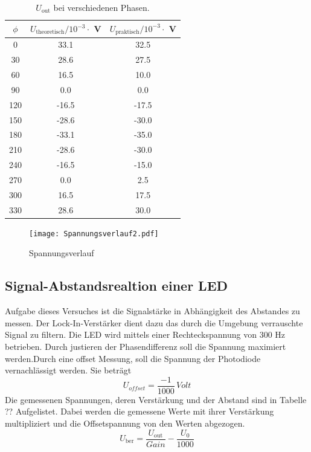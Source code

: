 \begin{table}
    \centering
    \begin{tabular}{c c c}
    	\toprule
    	$\phi$ & $U_{\text{theoretisch}} / 10^{-3} \cdot $ V & $U_{\text{praktisch}} / 10^{-3} \cdot $ V \\
    	\midrule
    	0   &  33.1  &  32.5        \\
    	30  &  28.6  &  27.5        \\
   	60  &  16.5  &  10.0       \\
    	90  &  0.0   &   0.0        \\
    	120 & -16.5  & -17.5        \\ 
    	150 & -28.6  & -30.0        \\
    	180 & -33.1  & -35.0        \\
    	210 & -28.6  & -30.0        \\
    	240 & -16.5  & -15.0        \\
    	270 &  0.0   &  2.5         \\
    	300 &  16.5  &  17.5        \\
  	330 &  28.6  &  30.0        \\
    	\end{tabular}
    \caption{$U_{\text{out}}$ bei verschiedenen Phasen.}
    \label{tab:Uphase2}
\end{table}

\begin{figure}
  \centering
  \texttt{[image: Spannungsverlauf2.pdf]}
  \caption{Spannungsverlauf}
  \label{fig:Spannungsverlauf}
\end{figure}

\subsection{Signal-Abstandsrealtion einer LED}
Aufgabe dieses Versuches ist die Signalstärke in Abhängigkeit des Abstandes zu messen. Der Lock-In-Verstärker dient dazu das durch die Umgebung verrauschte Signal zu filtern. Die LED wird mittels einer Rechteckspannung von 300 Hz betrieben. Durch justieren der Phasendifferenz soll die Spannung maximiert werden.Durch eine offset Messung, soll die Spannung der Photodiode vernachlässigt werden. Sie beträgt 
\begin{equation}
  U_{offset}= \frac{-1}{1000} \, Volt
  \label{Uoffset}
\end{equation}
Die gemessenen Spannungen, deren Verstärkung und der Abstand sind in Tabelle ?? Aufgelistet. Dabei werden die gemessene Werte mit ihrer Verstärkung multipliziert und  die Offsetspannung von den Werten abgezogen.
\begin{equation}
  U_{\text{ber}} = \frac{U_{\text{out}}}{Gain} - \frac{U_{0}}{1000}
  \label{Uber}
\end{equation}

